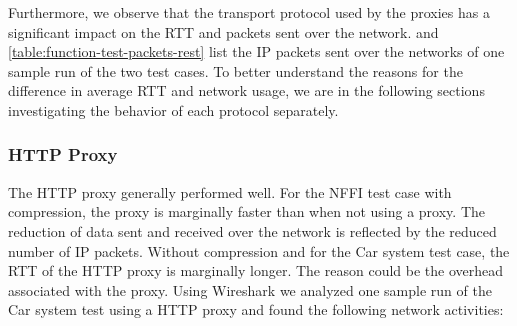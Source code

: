 Furthermore, we observe that the transport protocol used by the proxies has a
significant impact on the RTT and packets sent over the network.
 and
\cref{table:function-test-packets-rest} list the IP packets sent over the
networks of one sample run of the two test cases. To better understand the
reasons for the difference in average RTT and network usage, we are in the
following sections investigating the behavior of each protocol separately.

\subsubsection{HTTP Proxy}

The HTTP proxy generally performed well. For the NFFI test case with
compression, the proxy is marginally faster than when not using a proxy. The
reduction of data sent and received over the network is reflected by the reduced
number of IP packets. Without compression and for the Car system test case, the
RTT of the HTTP proxy is marginally longer. The reason could be the overhead
associated with the proxy. Using Wireshark we analyzed one sample run of the Car
system test using a HTTP proxy and found the following network activities:

